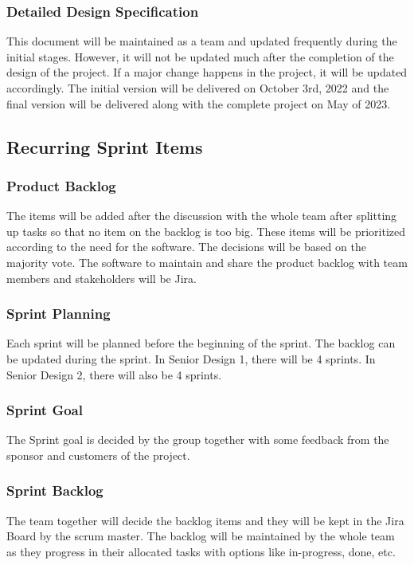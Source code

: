 \subsubsection{Detailed Design Specification}
This document will be maintained as a team and updated frequently during the initial stages. However, it will not be updated much after the completion of the design of the project. If a major change happens in the project, it will be updated accordingly. The initial version will be delivered on October 3rd, 2022 and the final version will be delivered along with the complete project on May of 2023.

\subsection{Recurring Sprint Items}
\subsubsection{Product Backlog}
The items will be added after the discussion with the whole team after splitting up tasks so that no item on the backlog is too big. These items will be prioritized according to the need for the software. The decisions will be based on the majority vote. The software to maintain and share the product backlog with team members and stakeholders will be Jira.

\subsubsection{Sprint Planning}
Each sprint will be planned before the beginning of the sprint. The backlog can be updated during the sprint. In Senior Design 1, there will be 4 sprints. In Senior Design 2, there will also be 4 sprints.

\subsubsection{Sprint Goal}
The Sprint goal is decided by the group together with some feedback from the sponsor and customers of the project. 

\subsubsection{Sprint Backlog}
The team together will decide the backlog items and they will be kept in the Jira Board by the scrum master. The backlog will be maintained by the whole team as they progress in their allocated tasks with options like in-progress, done, etc.

